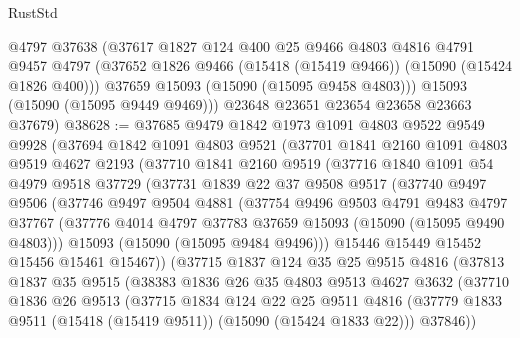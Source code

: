 \begin{lexlean}{RustStd}
\begin{coremodule}
        @4797
        @37638
        (@37617
          @1827
          @124
          @400
          @25
          @9466
          @4803
          @4816
          @4791
          @9457
          @4797
          (@37652 @1826 @9466 (@15418 (@15419 @9466)) (@15090 (@15424 @1826 @400)))
          @37659
          @15093
          (@15090 (@15095 @9458 @4803)))
        @15093
        (@15090 (@15095 @9449 @9469)))
      @23648
      @23651
      @23654
      @23658
      @23663
      @37679)
@38628 := @37685
    @9479
    @1842
    @1973
    @1091
    @4803
    @9522
    @9549
    @9928
    (@37694
      @1842
      @1091
      @4803
      @9521
      (@37701
        @1841
        @2160
        @1091
        @4803
        @9519
        @4627
        @2193
        (@37710
          @1841
          @2160
          @9519
          (@37716
            @1840
            @1091
            @54
            @4979
            @9518
            @37729
            (@37731
              @1839
              @22
              @37
              @9508
              @9517
              (@37740
                @9497
                @9506
                (@37746
                  @9497
                  @9504
                  @4881
                  (@37754
                    @9496
                    @9503
                    @4791
                    @9483
                    @4797
                    @37767
                    (@37776 @4014 @4797 @37783 @37659 @15093 (@15090 (@15095 @9490 @4803)))
                    @15093
                    (@15090 (@15095 @9484 @9496)))
                  @15446
                  @15449
                  @15452
                  @15456
                  @15461
                  @15467))
              (@37715
                @1837
                @124
                @35
                @25
                @9515
                @4816
                (@37813
                  @1837
                  @35
                  @9515
                  (@38383
                    @1836
                    @26
                    @35
                    @4803
                    @9513
                    @4627
                    @3632
                    (@37710
                      @1836
                      @26
                      @9513
                      (@37715
                        @1834
                        @124
                        @22
                        @25
                        @9511
                        @4816
                        (@37779 @1833 @9511 (@15418 (@15419 @9511)) (@15090 (@15424 @1833 @22)))
                        @37846))

\end{coremodule}
\end{lexlean}
